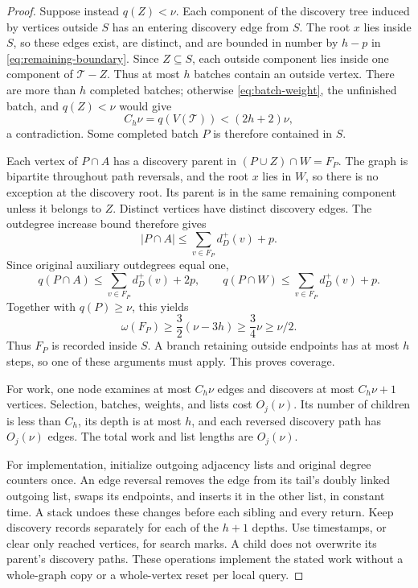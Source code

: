 \documentclass[11pt]{article}
\theoremstyle{definition}
\theoremstyle{remark}
\newcommand{\wt}{\omega}
\begin{document}
\begin{proof}
Suppose instead \(q(Z)<\nu\). Each component of the discovery tree induced by vertices outside \(S\) has an entering discovery edge from \(S\). The root \(x\) lies inside \(S\), so these edges exist, are distinct, and are bounded in number by \(h-p\) in \eqref{eq:remaining-boundary}. Since \(Z\subseteq S\), each outside component lies inside one component of \(\mathcal T-Z\). Thus at most \(h\) batches contain an outside vertex. There are more than \(h\) completed batches; otherwise \eqref{eq:batch-weight}, the unfinished batch, and \(q(Z)<\nu\) would give
\[
 C_h\nu=q(V(\mathcal T))<(2h+2)\nu,
\]
a contradiction. Some completed batch \(P\) is therefore contained in \(S\).

Each vertex of \(P\cap A\) has a discovery parent in \((P\cup Z)\cap W=F_P\). The graph is bipartite throughout path reversals, and the root \(x\) lies in \(W\), so there is no exception at the discovery root. Its parent is in the same remaining component unless it belongs to \(Z\). Distinct vertices have distinct discovery edges. The outdegree increase bound therefore gives
\[
 |P\cap A|\le\sum_{v\in F_P}d_D^+(v)+p.
\]
Since original auxiliary outdegrees equal one,
\[
 q(P\cap A)\le\sum_{v\in F_P}d_D^+(v)+2p,
 \qquad
 q(P\cap W)\le\sum_{v\in F_P}d_D^+(v)+p.
\]
Together with \(q(P)\ge\nu\), this yields
\[
 \wt(F_P)\ge\frac32(\nu-3h)\ge\frac34\nu\ge\nu/2.
\]
Thus \(F_P\) is recorded inside \(S\). A branch retaining outside endpoints has at most \(h\) steps, so one of these arguments must apply. This proves coverage.

For work, one node examines at most \(C_h\nu\) edges and discovers at most \(C_h\nu+1\) vertices. Selection, batches, weights, and lists cost \(O_j(\nu)\). Its number of children is less than \(C_h\), its depth is at most \(h\), and each reversed discovery path has \(O_j(\nu)\) edges. The total work and list lengths are \(O_j(\nu)\).

For implementation, initialize outgoing adjacency lists and original degree counters once. An edge reversal removes the edge from its tail's doubly linked outgoing list, swaps its endpoints, and inserts it in the other list, in constant time. A stack undoes these changes before each sibling and every return. Keep discovery records separately for each of the \(h+1\) depths. Use timestamps, or clear only reached vertices, for search marks. A child does not overwrite its parent's discovery paths. These operations implement the stated work without a whole-graph copy or a whole-vertex reset per local query.
\end{proof}
\end{document}
